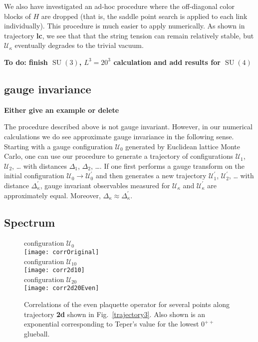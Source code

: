 \documentclass[preprint,aps,prd]{revtex4-2}
\newcommand{\config}{\mathcal{U}}
\DeclareMathOperator{\SU}{SU}
\begin{document}
We also have investigated an ad-hoc procedure where
the off-diagonal color blocks of $H$ are dropped (that is, the
saddle point search is applied to each link individually).
This procedure is much easier to apply numerically.
As shown in trajectory {\bf lc},
we see that that the string tension can remain relatively stable,
but $\config_\kappa$ eventually degrades to the trivial vacuum.

{\bf  To do:
  finish $\SU(3)$, $L^3=20^3$ calculation and
  add results for $\SU(4)$}

\subsection{gauge invariance}

{\bf Either give an example or delete }

The procedure described above is not gauge invariant.
However, in our numerical calculations we do see approximate
gauge invariance in the following
sense.  Starting with a gauge configuration $\config_0$ generated
by Euclidean lattice Monte Carlo, one can
use our procedure to generate a trajectory of configurations
$\config_1$, $\config_2$, \ldots
with distances $\Delta_1$, $\Delta_2$, \ldots.
If one first performs a gauge transform on the initial
configuration $\config_0 \to \config_0^\prime$ and then generates a
new trajectory $\config_1^\prime$, $\config_2^\prime$, \ldots
with distance $\Delta_\kappa^\prime$,
gauge invariant observables
measured for $\config_\kappa$ and $\config_\kappa^\prime$ are approximately equal.
Moreover,  $\Delta_\kappa \approx \Delta_\kappa^\prime$.


\subsection{Spectrum}

\begin{figure}
   configuration $\config_0$\\
   \texttt{[image: corrOriginal]}\\
   configuration $\config_{10}$\\
   \texttt{[image: corr2d10]}\\
   configuration $\config_{20}$\\
   \texttt{[image: corr2d20Even]}
\caption{Correlations of the even plaquette operator for several points
  along trajectory {\bf 2d} shown in Fig.~\ref{trajectory3}.
  Also shown is an exponential corresponding to Teper's value
  for the lowest $0^{++}$ glueball.
  \label{corr2dEven}}
\end{figure}
\end{document}
